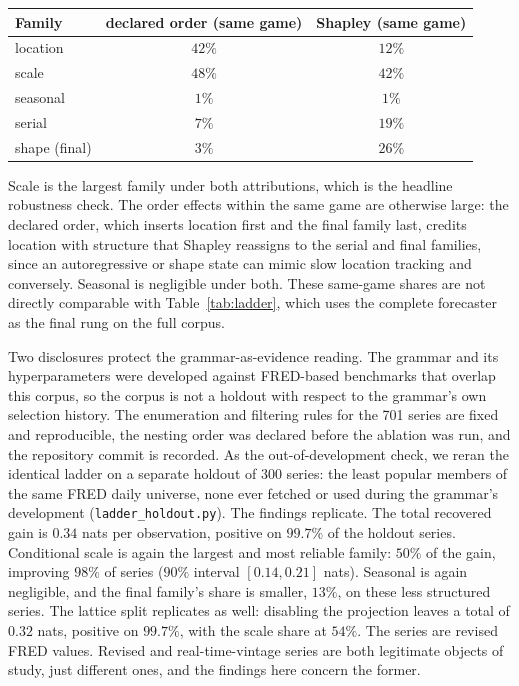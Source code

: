\documentclass[11pt]{article}
\theoremstyle{remark}
\begin{document}
\begin{center}
\small
\begin{tabular}{lcc}
\toprule
Family & declared order (same game) & Shapley (same game)\\
\midrule
location & $42\%$ & $12\%$\\
scale & $48\%$ & $42\%$\\
seasonal & $1\%$ & $1\%$\\
serial & $7\%$ & $19\%$\\
shape (final) & $3\%$ & $26\%$\\
\bottomrule
\end{tabular}
\end{center}

Scale is the largest family under both attributions, which is the headline robustness check.
The order effects within the same game are otherwise large: the declared order, which
inserts location first and the final family last, credits location with structure that
Shapley reassigns to the serial and final families, since an autoregressive or shape state
can mimic slow location tracking and conversely. Seasonal is negligible under both. These
same-game shares are not directly comparable with Table~\ref{tab:ladder}, which uses the
complete forecaster as the final rung on the full corpus.

Two disclosures protect the grammar-as-evidence reading. The grammar and its hyperparameters
were developed against FRED-based benchmarks that overlap this corpus, so the corpus is not a
holdout with respect to the grammar's own selection history. The enumeration and filtering
rules for the 701 series are fixed and reproducible, the nesting order was declared before
the ablation was run, and the repository commit is recorded. As the out-of-development check,
we reran the identical ladder on a separate holdout of 300 series: the least popular members
of the same FRED daily universe, none ever fetched or used during the grammar's development
(\texttt{ladder\_holdout.py}). The findings replicate. The total recovered gain is $0.34$ nats per observation, positive on $99.7\%$ of the
holdout series. Conditional scale is again the largest and most reliable family: $50\%$ of
the gain, improving $98\%$ of series ($90\%$ interval $[0.14,0.21]$ nats). Seasonal is again negligible, and the final family's share is smaller, $13\%$, on these
less structured series. The lattice split replicates as well: disabling the projection leaves
a total of $0.32$ nats, positive on $99.7\%$, with the scale share at $54\%$. The series are revised FRED values. Revised and real-time-vintage series are both
legitimate objects of study, just different ones, and the findings here concern the former.
\end{document}
